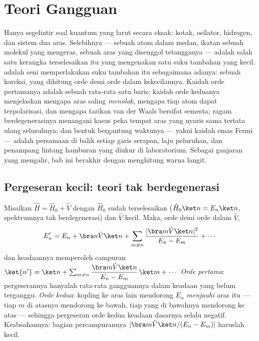 \chapter{Teori Gangguan}\label{ch:b3:perturbation-theory}

Hanya segelintir soal kuantum yang larut secara eksak: kotak, osilator,
hidrogen, dan sistem dua aras. Selebihnya --- sebuah atom dalam medan,
ikatan sebuah molekul yang mengeras, sebuah aras yang disenggol
tetangganya --- adalah salah satu kerangka terselesaikan itu yang
mengenakan satu suku tambahan yang kecil.  adalah seni
memperlakukan suku tambahan itu sebagaimana adanya: sebuah koreksi, yang
dihitung orde demi orde dalam kekecilannya. Kaidah orde pertamanya
adalah sebuah rata-rata satu baris; kaidah orde keduanya menjelaskan
mengapa aras saling \emph{menolak}, mengapa tiap atom dapat
terpolarisasi, dan mengapa tarikan van der Waals bersifat semesta;
ragam berdegenerasinya menangani kasus peka tempat aras yang nyaris sama
tertata ulang seluruhnya; dan bentuk bergantung waktunya --- yakni
kaidah emas Fermi --- adalah persamaan di balik setiap garis serapan,
laju peluruhan, dan penampang lintang hamburan yang diukur di
laboratorium. Sebagai ganjaran yang mengalir, bab ini berakhir dengan
menghitung warna langit.

\section{Pergeseran kecil: teori tak berdegenerasi}

\begin{theorem}\label{thm:b3:perturbation-theory:corrections}
Misalkan $\hat H = \hat H_0 + \hat V$ dengan $\hat H_0$ sudah
terselesaikan ($\hat H_0\ket n = E_n\ket n$, spektrumnya tak
berdegenerasi) dan $\hat V$ kecil. Maka, orde demi orde dalam $\hat V$,
\[
E_n' = E_n + \bra n\hat V\ket n
 + \sum_{m \neq n}\frac{|\bra m\hat V\ket n|^2}{E_n - E_m}
 + \cdots
\]
dan keadaannya memperoleh campuran $\ket{n'} = \ket n + \sum_{m\neq
n}\dfrac{\bra m\hat V\ket n}{E_n - E_m}\,\ket m + \cdots$
\emph{Orde pertama}: pergeserannya hanyalah rata-rata gangguannya dalam
keadaan yang belum terganggu. \emph{Orde kedua}: kopling ke aras lain
mendorong $E_n$ \emph{menjauhi} aras itu --- tiap $m$ di atasnya
mendorong ke bawah, tiap yang di bawahnya mendorong ke atas --- sehingga
pergeseran orde kedua keadaan dasarnya selalu negatif. Keabsahannya:
bagian percampurannya $|\bra m\hat V\ket n/(E_n - E_m)|$ haruslah kecil.
\end{theorem}

